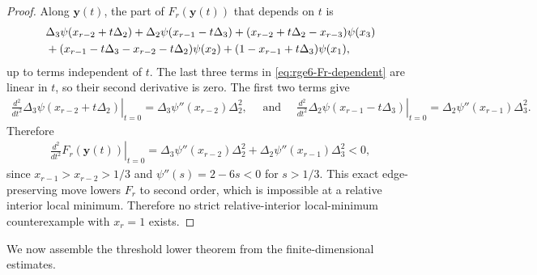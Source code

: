 \documentclass[10pt,a4paper]{article}
\begin{document}
\begin{proof}
Along $\mathbf{y}(t)$, the part of $F_r(\mathbf{y}(t))$ that depends on $t$ is
\begin{align}\label{eq:rge6-Fr-dependent}
&\Delta_3\psi(x_{r-2}+t\Delta_2)+\Delta_2\psi(x_{r-1}-t\Delta_3)+(x_{r-2}+t\Delta_2-x_{r-3})\psi(x_3)\notag\\
&+(x_{r-1}-t\Delta_3-x_{r-2}-t\Delta_2)\psi(x_2)+(1-x_{r-1}+t\Delta_3)\psi(x_1),
\end{align}
up to terms independent of $t$.  The last three terms in  \eqref{eq:rge6-Fr-dependent} are linear in $t$, so their second derivative is zero.  The first two terms give
\begin{align*}
  \left.\frac{d^2}{dt^2}\Delta_3\psi(x_{r-2}+t\Delta_2)\right|_{t=0}
  =\Delta_3\psi''(x_{r-2})\Delta_2^2,
\quad\text{ and }\quad
  \left.\frac{d^2}{dt^2}\Delta_2\psi(x_{r-1}-t\Delta_3)\right|_{t=0}
  =\Delta_2\psi''(x_{r-1})\Delta_3^2.
\end{align*}
Therefore
\begin{align}\label{eq:six-second}
  \left.\frac{d^2}{dt^2}F_r(\mathbf{y}(t))\right|_{t=0}
  =\Delta_3\psi''(x_{r-2})\Delta_2^2+\Delta_2\psi''(x_{r-1})\Delta_3^2<0,
\end{align}
since $x_{r-1}>x_{r-2}>1/3$ and $\psi''(s)=2-6s<0$ for $s>1/3$.  This exact edge-preserving move lowers $F_r$ to second order, which is impossible at a relative interior local minimum.  Therefore no strict relative-interior local-minimum counterexample with $x_r=1$ exists.
\end{proof}

We now assemble the threshold lower theorem from the finite-dimensional 
estimates.
\end{document}
